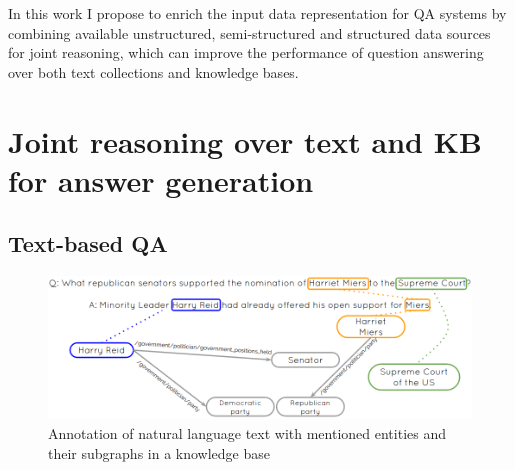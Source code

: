 %

\newif\ifcompress
\compresstrue   %
\compressfalse %



\noindent 
In this work I propose to enrich the input data representation for QA systems by combining available unstructured, semi-structured and structured data sources for joint reasoning, which can improve the performance of question answering over both text collections and knowledge bases.


\section{Joint reasoning over text and KB for answer generation}


\subsection{Text-based QA}

\begin{figure}
\centering
\includegraphics[width=1.0\textwidth]{figures/text_kb}
\caption{Annotation of natural language text with mentioned entities and their subgraphs in a knowledge base}
\label{fig:text_kb}
\end{figure}

